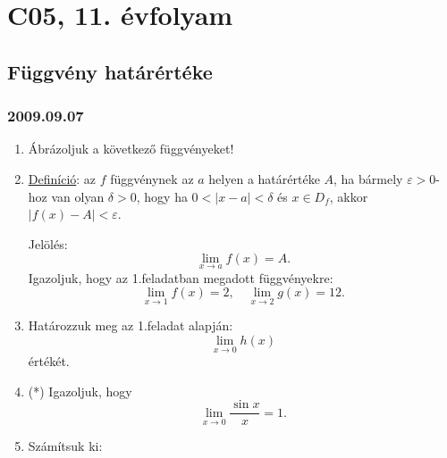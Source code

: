 \chapter{C05, 11. évfolyam}
\section{Függvény határértéke}
\subsection*{2009.09.07}
\begin{enumerate}
\item Ábrázoljuk a következő függvényeket!
\item\underline{Definíció}: az $f$ függvénynek az $a$ helyen a határértéke $A$, ha bármely $\varepsilon>0$-hoz van olyan $\delta>0$, hogy ha $0<|x-a|<\delta$ és $x\in D_f$, akkor $|f(x)-A|<\varepsilon$.

Jelölés: $$\lim_{x\to a}f(x)=A.$$
Igazoljuk, hogy az 1.feladatban megadott függvényekre: 
$$\lim_{x\to 1}f(x)=2,\quad \lim_{x\to 2}g(x)=12.$$
\item Határozzuk meg az 1.feladat alapján:
$$\lim_{x\to 0}h(x)$$értékét.
\item(*) Igazoljuk, hogy
$$\lim_{x\to 0}\frac{\sin x}{x}=1.$$
\item Számítsuk ki:
\end{enumerate}

